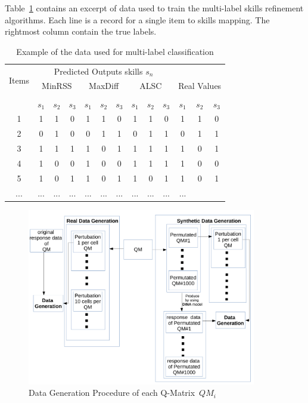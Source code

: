 \documentclass[11pt]{article}
\begin{document}
Table~\ref{ref:data} contains an excerpt of data used to train the multi-label skills refinement algorithms.  Each line is a record for a single item to skills mapping.
The rightmost column contain the true labels. 
\begin{table}
\centering
	\begin{tabular}{c|ccccccccc|ccc}	
\toprule
\multirow{3}{*}{Items} & \multicolumn{9}{c}{Predicted Outputs skills $s_n$}\\
\cmidrule{2-9}
& \multicolumn{3}{c}{ MinRSS } & \multicolumn{3}{c}{MaxDiff}&\multicolumn{3}{c|}{ALSC}& \multicolumn{3}{c}{Real Values} \\ \\
\cmidrule{2-9}
& $s_1$ & $s_2$ & $s_3$ & $s_1$ & $s_2$ & $s_3$ & $s_1$ & $s_2$ & $s_3$  & \textbf{$s_1$} & \textbf{$s_2$} & \textbf{$s_3$}\\ \hline

	1 & 1 & 1 & 0 & 1 & 1 & 0 & 1 & 1 & 0  & 1 & 1 & 0 \\
	2 & 0 & 1 & 0 & 0 & 1 & 1 & 0 & 1 & 1 & 0 & 1 & 1 \\
	3 & 1 & 1 & 1 & 1 & 0 & 1 &1 & 1 & 1 & 1 & 0 & 1\\
	4 & 1 & 0 & 0 & 1 & 0 & 0 & 1 & 1 & 1 & 1 & 0 & 0 \\
	5 & 1 & 0 & 1 & 1 & 0 & 1 & 1 & 0 & 1  & 1 & 0 & 1\\
	... &... &... &... &... &... &... &... &... &... &...\\
	 \hline\hline
       
	\end{tabular}

\caption{Example of the data used for multi-label classification} \label{ref:data} 
\end{table}




\begin{figure}
  \centering
    \includegraphics[width=100mm ,scale=0.5]{graph/DG.pdf}
  \caption{Data Generation Procedure of each Q-Matrix~$QM_i$}  \label{fig:DG}
\end{figure}
\end{document}
